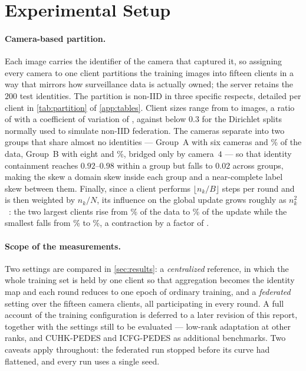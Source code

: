 \section{Experimental Setup}\label{sec:setup}

\paragraph{Camera-based partition.} Each image carries the identifier of the camera that captured it, so assigning every camera to one client partitions the \numTotImg{} training images into fifteen clients in a way that mirrors how surveillance data is actually owned; the server retains the $200$ test identities. The partition is non-IID in three specific respects, detailed per client in \cref{tab:partition} of \cref{app:tables}. Client sizes range from \numImgMin{} to \numImgMax{} images, a ratio of \numImgRatio{} with a coefficient of variation of \numCVSize, against below $0.3$ for the Dirichlet splits normally used to simulate non-IID federation. The cameras separate into two groups that share almost no identities --- Group~A with six cameras and \numShareA\% of the data, Group~B with eight and \numShareB\%, bridged only by camera~$4$ --- so that identity containment reaches $0.92$--$0.98$ within a group but falls to $0.02$ across groups, making the skew a domain skew inside each group and a near-complete label skew between them. Finally, since a client performs $\lfloor n_{k}/B\rfloor$ steps per round and is then weighted by $n_{k}/N$, its influence on the global update grows roughly as $n_{k}^{2}$~\citep{wang2020tacklingobjectiveinconsistencyproblem}: the two largest clients rise from \numTwoShareNom\% of the data to \numTwoShareEff\% of the update while the smallest falls from \numNomTwo\% to \numEffTwo\%, a contraction by a factor of \numSqueeze.

\paragraph{Scope of the measurements.} Two settings are compared in \cref{sec:results}: a \emph{centralized} reference, in which the whole training set is held by one client so that aggregation becomes the identity map and each round reduces to one epoch of ordinary training, and a \emph{federated} setting over the fifteen camera clients, all participating in every round. A full account of the training configuration is deferred to a later revision of this report, together with the settings still to be evaluated --- low-rank adaptation at other ranks, and CUHK-PEDES and ICFG-PEDES as additional benchmarks. Two caveats apply throughout: the federated run stopped before its curve had flattened, and every run uses a single seed.
